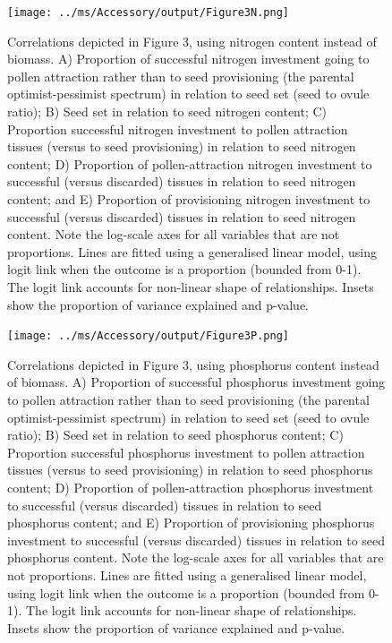 \documentclass[10pt,twoside]{article}\usepackage[]{graphicx}\usepackage[]{color}
\begin{document}
\begin{figure}[h]
\centering
\texttt{[image: ../ms/Accessory/output/Figure3N.png]}
\caption{Correlations depicted in Figure 3, using nitrogen content instead of biomass. A) Proportion of successful nitrogen investment going to pollen attraction rather than to seed provisioning (the parental optimist-pessimist spectrum) in relation to seed set (seed to ovule ratio); B) Seed set in relation to seed nitrogen content; C) Proportion successful nitrogen investment to pollen attraction tissues (versus to seed provisioning) in relation to seed nitrogen content; D) Proportion of pollen-attraction nitrogen investment to successful (versus discarded) tissues in relation to seed nitrogen content; and E) Proportion of provisioning nitrogen investment to successful (versus discarded) tissues in relation to seed nitrogen content. Note the log-scale axes for all variables that are not proportions. Lines are fitted using a generalised linear model, using logit link when the outcome is a proportion (bounded from 0-1). The logit link accounts for non-linear shape of relationships. Insets show the proportion of variance explained and p-value.}
\end{figure}

\clearpage

\begin{figure}[h]
  \centering
  \texttt{[image: ../ms/Accessory/output/Figure3P.png]}
  \caption{Correlations depicted in Figure 3, using phosphorus content instead of biomass. A) Proportion of successful phosphorus investment going to pollen attraction rather than to seed provisioning (the parental optimist-pessimist spectrum) in relation to seed set (seed to ovule ratio); B) Seed set in relation to seed phosphorus content; C) Proportion successful phosphorus investment to pollen attraction tissues (versus to seed provisioning) in relation to seed phosphorus content; D) Proportion of pollen-attraction phosphorus investment to successful (versus discarded) tissues in relation to seed phosphorus content; and E) Proportion of provisioning phosphorus investment to successful (versus discarded) tissues in relation to seed phosphorus content. Note the log-scale axes for all variables that are not proportions. Lines are fitted using a generalised linear model, using logit link when the outcome is a proportion (bounded from 0-1). The logit link accounts for non-linear shape of relationships. Insets show the proportion of variance explained and p-value.}
  \end{figure}
  
\end{document}
